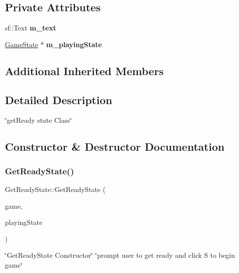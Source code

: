 \subsection*{Private Attributes}
\begin{DoxyCompactItemize}
\item 
\mbox{\label{classGetReadyState_a123fad5ff8dd03c535873daad9bca244}} 
sf\+::\+Text {\bfseries m\+\_\+text}
\item 
\mbox{\label{classGetReadyState_ad9a0a3d03327f9843363420eea85f5f0}} 
\hyperlink{classGameState}{Game\+State} $\ast$ {\bfseries m\+\_\+playing\+State}
\end{DoxyCompactItemize}
\subsection*{Additional Inherited Members}


\subsection{Detailed Description}
\char`\"{}get\+Ready state Class\char`\"{} 

\subsection{Constructor \& Destructor Documentation}
\mbox{\label{classGetReadyState_a4b541b06511665065c171a577c58ef07}} 
\subsubsection{\texorpdfstring{Get\+Ready\+State()}{GetReadyState()}}
{\footnotesize\ttfamily Get\+Ready\+State\+::\+Get\+Ready\+State (\begin{DoxyParamCaption}\item[{\hyperlink{classGame}{Game} $\ast$}]{game,  }\item[{\hyperlink{classGameState}{Game\+State} $\ast$}]{playing\+State }\end{DoxyParamCaption})}



\char`\"{}\+Get\+Ready\+State Constructor\char`\"{}  \char`\"{}prompt user to get ready and click S to begin game\char`\"{} 


